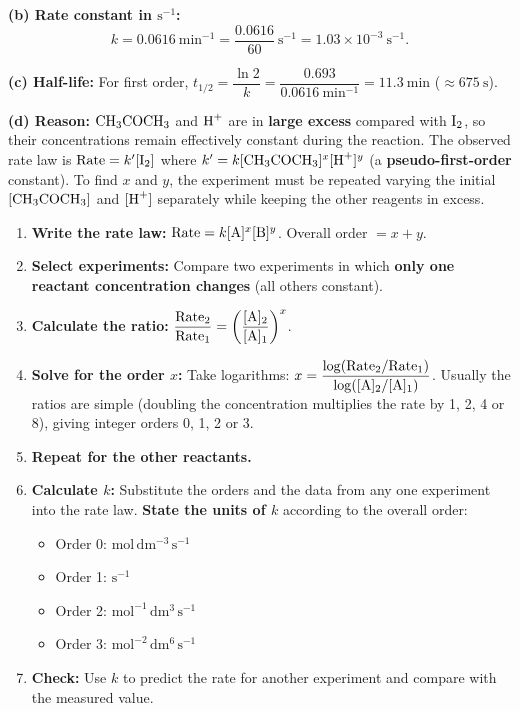 \documentclass[11pt]{article}
\begin{document}
\begin{exoresolu}
\textbf{(b) Rate constant in $\mathrm{s^{-1}}$:}
\[ k = 0.0616\ \mathrm{min^{-1}} = \frac{0.0616}{60}\ \mathrm{s^{-1}} = \boxed{1.03 \times 10^{-3}\ \mathrm{s^{-1}}}. \]

\textbf{(c) Half-life:} For first order, $t_{1/2} = \dfrac{\ln 2}{k} = \dfrac{0.693}{0.0616\ \mathrm{min^{-1}}} = \boxed{11.3\ \mathrm{min}}$ ($\approx 675\ \mathrm{s}$).

\textbf{(d) Reason:} $\ce{CH3COCH3}$ and $\ce{H+}$ are in \textbf{large excess} compared with $\ce{I2}$, so their concentrations remain effectively constant during the reaction. The observed rate law is $\text{Rate} = k'[\ce{I2}]$ where $k' = k[\ce{CH3COCH3}]^x[\ce{H+}]^y$ (a \textbf{pseudo-first-order} constant). To find $x$ and $y$, the experiment must be repeated varying the initial $[\ce{CH3COCH3}]$ and $[\ce{H+}]$ separately while keeping the other reagents in excess.
\end{exoresolu}

\begin{methode}
\begin{enumerate}
\item \textbf{Write the rate law:} $\text{Rate} = k[\ce{A}]^x[\ce{B}]^y$. Overall order $= x+y$.
\item \textbf{Select experiments:} Compare two experiments in which \textbf{only one reactant concentration changes} (all others constant).
\item \textbf{Calculate the ratio:} $\dfrac{\text{Rate}_2}{\text{Rate}_1} = \left(\dfrac{[\ce{A}]_2}{[\ce{A}]_1}\right)^x$.
\item \textbf{Solve for the order $x$:} Take logarithms: $x = \dfrac{\log(\text{Rate}_2/\text{Rate}_1)}{\log([\ce{A}]_2/[\ce{A}]_1)}$. Usually the ratios are simple (doubling the concentration multiplies the rate by 1, 2, 4 or 8), giving integer orders 0, 1, 2 or 3.
\item \textbf{Repeat for the other reactants.}
\item \textbf{Calculate $k$:} Substitute the orders and the data from any one experiment into the rate law. \textbf{State the units of $k$} according to the overall order:
    \begin{itemize}
    \item Order 0: $\mathrm{mol\,dm^{-3}\,s^{-1}}$
    \item Order 1: $\mathrm{s^{-1}}$
    \item Order 2: $\mathrm{mol^{-1}\,dm^3\,s^{-1}}$
    \item Order 3: $\mathrm{mol^{-2}\,dm^6\,s^{-1}}$
    \end{itemize}
\item \textbf{Check:} Use $k$ to predict the rate for another experiment and compare with the measured value.
\end{enumerate}
\end{methode}
\end{document}
